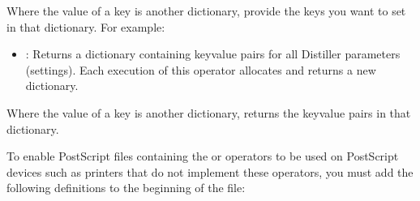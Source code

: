 \documentclass[letterpaper,12pt,english,openany,oneside]{sphinxmanual}
\begin{document}
Where the value of a key is another dictionary, provide the keys you want to set in that dictionary. For example:

\begin{sphinxVerbatim}[commandchars=\\\{\}]
   
     \PYG{p}{[}   \PYG{p}{]}  \PYG{p}{[}   \PYG{p}{]}
   
\end{sphinxVerbatim}
\begin{itemize}
\item {} 
 : Returns a dictionary containing key\sphinxhyphen{}value pairs for all Distiller parameters (settings). Each execution of this operator allocates and returns a new dictionary.

\end{itemize}

Where the value of a key is another dictionary,  returns the key\sphinxhyphen{}value pairs in that dictionary.

To enable PostScript files containing the  or  operators to be used on PostScript devices such as printers that do not implement these operators, you must add the following definitions to the beginning of the file:

\begin{sphinxVerbatim}[commandchars=\\\{\}]
  
      
   
     
\end{sphinxVerbatim}
\end{document}
